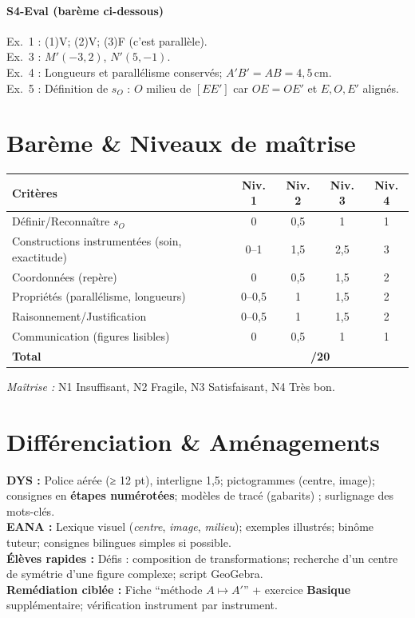 \paragraph{S4-Eval (barème ci-dessous)}
Ex.~1 : (1)V; (2)V; (3)F (c’est parallèle). \\
Ex.~3 : $M'({-}3,2)$, $N'(5,{-}1)$. \\
Ex.~4 : Longueurs et parallélisme conservés; $A'B'=AB=4{,}5$\,cm. \\
Ex.~5 : Définition de $s_O$ : $O$ milieu de $[EE']$ car $OE=OE'$ et $E,O,E'$ alignés.

\section*{Barème \& Niveaux de maîtrise}
\begin{center}
	\begin{tabular}{|p{7cm}|c|c|c|c|}
		\hline
		\textbf{Critères} & \textbf{Niv. 1} & \textbf{Niv. 2} & \textbf{Niv. 3} & \textbf{Niv. 4} \\
		\hline
		Définir/Reconnaître $s_O$ & 0 & 0,5 & 1 & 1 \\
		\hline
		Constructions instrumentées (soin, exactitude) & 0–1 & 1,5 & 2,5 & 3 \\
		\hline
		Coordonnées (repère) & 0 & 0,5 & 1,5 & 2 \\
		\hline
		Propriétés (parallélisme, longueurs) & 0–0,5 & 1 & 1,5 & 2 \\
		\hline
		Raisonnement/Justification & 0–0,5 & 1 & 1,5 & 2 \\
		\hline
		Communication (figures lisibles) & 0 & 0,5 & 1 & 1 \\
		\hline
		\textbf{Total} & \multicolumn{4}{c|}{\textbf{/20}} \\
		\hline
	\end{tabular}
\end{center}
\textit{Maîtrise :} N1 Insuffisant, N2 Fragile, N3 Satisfaisant, N4 Très bon.

\section*{Différenciation \& Aménagements}
\textbf{DYS :} Police aérée (≥ 12 pt), interligne 1,5; pictogrammes (centre, image); consignes en \textbf{étapes numérotées}; modèles de tracé (gabarits) ; surlignage des mots-clés.\\
\textbf{EANA :} Lexique visuel (\emph{centre}, \emph{image}, \emph{milieu}); exemples illustrés; binôme tuteur; consignes bilingues simples si possible.\\
\textbf{Élèves rapides :} Défis : composition de transformations; recherche d’un centre de symétrie d’une figure complexe; script GeoGebra.\\
\textbf{Remédiation ciblée :} Fiche ``méthode $A\mapsto A'$'' + exercice \textbf{Basique} supplémentaire; vérification instrument par instrument.

